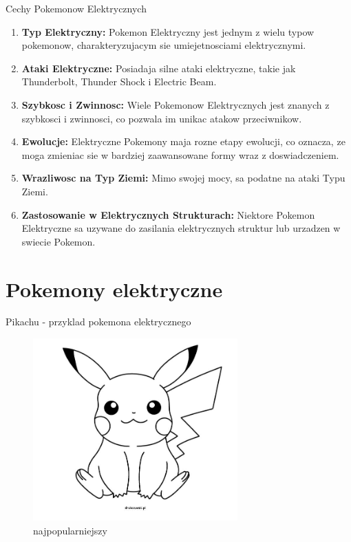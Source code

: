 \documentclass{beamer}
\begin{document}
\begin{frame}{Cechy Pokemonow Elektrycznych}
  \begin{enumerate}
    \item \textbf{Typ Elektryczny:} Pokemon Elektryczny jest jednym z wielu typow pokemonow, charakteryzujacym sie umiejetnosciami elektrycznymi.

    \item \textbf{Ataki Elektryczne:} Posiadaja silne ataki elektryczne, takie jak Thunderbolt, Thunder Shock i Electric Beam.

    \item \textbf{Szybkosc i Zwinnosc:} Wiele Pokemonow Elektrycznych jest znanych z szybkosci i zwinnosci, co pozwala im unikac atakow przeciwnikow.

    \item \textbf{Ewolucje:} Elektryczne Pokemony maja rozne etapy ewolucji, co oznacza, ze moga zmieniac sie w bardziej zaawansowane formy wraz z doswiadczeniem.

    \item \textbf{Wrazliwosc na Typ Ziemi:} Mimo swojej mocy, sa podatne na ataki Typu Ziemi.

    \item \textbf{Zastosowanie w Elektrycznych Strukturach:} Niektore Pokemon Elektryczne sa uzywane do zasilania elektrycznych struktur lub urzadzen w swiecie Pokemon.
  \end{enumerate}
\end{frame}


\section{Pokemony elektryczne}

\begin{frame}{Pikachu - przyklad pokemona elektrycznego}
  \begin{figure}
    \centering
    \includegraphics[width=0.7\textwidth]{rys1.jpg}
    \caption{najpopularniejszy}
    \label{fig:rys1}
  \end{figure}
\end{frame}
\end{document}
